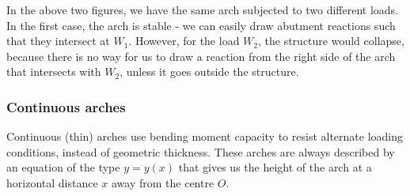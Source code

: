 \documentclass{article}
\begin{document}
In the above two figures, we have the same arch subjected to two different loads. In the first case, the arch is stable - we can easily draw abutment reactions such that they intersect at $W_1$. However, for the load $W_2$, the structure would collapse, because there is no way for us to draw a reaction from the right side of the arch that intersects with $W_2$, unless it goes outside the structure.

\subsubsection{Continuous arches}

Continuous (thin) arches use bending moment capacity to resist alternate loading conditions, instead of geometric thickness. These arches are always described by an equation of the type $y = y(x)$ that gives us the height of the arch at a horizontal distance $x$ away from the centre $O$.
\end{document}
